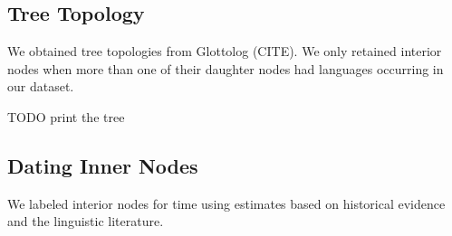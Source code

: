 \documentclass[11pt,a4paper]{article}
\begin{document}
\subsection{Tree Topology}

We obtained tree topologies from Glottolog (CITE).
We only retained interior nodes when more than one of their daughter nodes had languages occurring in our dataset.

TODO print the tree


\subsection{Dating Inner Nodes}
We labeled interior nodes for time using estimates based on historical evidence and the linguistic literature.
\end{document}
